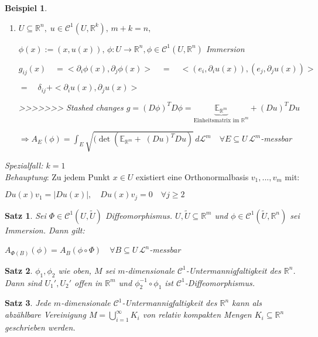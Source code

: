 \documentclass[11pt]{memoir}
\theoremstyle{changebreak}
\newtheorem{Beispiel}{Beispiel}[chapter]
\newtheorem{Satz}{Satz}[chapter]
\begin{document}
\begin{Beispiel}
\begin{enumerate}
	\item $U \subseteq \mathbb R^n, \;u \in \mathscr C^1(U, \mathbb R^k), \, m+k =n,$
	\par
	$ \phi(x) := (x, u(x)), \, \phi: U \rightarrow \mathbb R^n, \phi \in \mathscr C^1(U, \mathbb R^n)$ Immersion 
	\par
	$g_{ij}(x) \quad = <\partial_i \phi(x), \partial_j \phi(x)> \quad=\quad <(e_i, \partial_i u(x)), (e_j, \partial_j u(x))> \quad$
	\par
	$= \quad \delta_{ij} + <\partial_i u(x), \partial_j u(x)> $ 
	\par
>>>>>>> Stashed changes
	$g = (D\phi)^T D\phi = \underbrace{\mathbb E_{\mathbb R^m}}_{\text{Einheitsmatrix im }\mathbb R^m} + (Du)^TDu$  \\%
	\par\bigskip
	$\Rightarrow A_E(\phi) = \int_E \sqrt{(\det(\mathbb E_{\mathbb R^m} +\; (Du)^TDu)}\,d\mathscr L^m \quad \forall E \subseteq U\, \mathscr L^m$-messbar
\end{enumerate}
\end{Beispiel}

\par\bigskip
\emph{Spezialfall: $k=1$} \\
\emph{Behauptung}: Zu jedem Punkt $x \in U$ existiert eine Orthonormalbasis $v_1, ... , v_m$ mit:
\begin{center}
	$Du(x) v_1 = |Du(x)|, \quad Du(x) v_j = 0\quad \forall j \geq 2$
\end{center}


\begin{Satz}
Sei $\Phi \in \mathscr C^1(U, \tilde U)$ Diffeomorphismus. $U, \tilde U \subseteq \mathbb R^m$ und $\phi \in \mathscr C^1(\tilde U, \mathbb R^n)$ sei Immersion. Dann gilt:
\begin{center}
	$A_{\Phi(B)}(\phi) = A_B (\phi \circ \Phi) \quad \forall B \subseteq U \, \mathscr L^n$-messbar
\end{center}
\end{Satz}

\begin{Satz}
$\phi_1, \phi_2$ wie oben, $M$ sei $m$-dimensionale $\mathscr C^1$-Untermannigfaltigkeit des $\mathbb R^n$. Dann sind $U_1 ', U_2 '$ offen in $\mathbb R^m$ und $\phi_2^{-1}\circ \phi_1$ ist $\mathscr C^1$-Diffeomorphismus.
\end{Satz}

\begin{Satz}
Jede $m$-dimensionale $\mathscr C^1$-Untermannigfaltigkeit des $\mathbb R^n$ kann als abzählbare Vereinigung $M = \bigcup\limits_{i=1}^\infty K_i$ von relativ kompakten Mengen $K_i \subseteq \mathbb R^n$ geschrieben werden.
\end{Satz}
\end{document}
